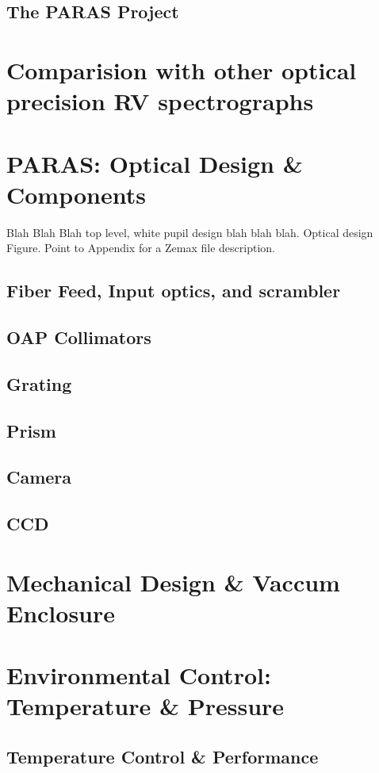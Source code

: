\documentclass[12pt,preprint]{emulateapj}
\begin{document}
\subsection{ The PARAS Project}
\section{Comparision with other optical precision RV spectrographs}
\section{PARAS: Optical Design \& Components}
\label{optdesign}
Blah Blah Blah top level, white pupil design blah blah blah. Optical design Figure. Point to Appendix for a Zemax file description.
\subsection{Fiber Feed, Input optics, and scrambler}
\subsection{OAP Collimators}
\subsection{Grating}
\subsection{Prism}
\subsection{Camera}
\subsection{CCD}
\section{Mechanical Design \& Vaccum Enclosure}
\section{Environmental Control: Temperature \& Pressure}
\subsection{Temperature Control \& Performance}
\end{document}

